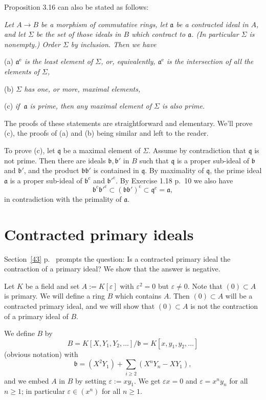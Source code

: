 \documentclass[parskip=half]{scrartcl}%
\newcommand{\oo}{\operatorname}
\newcommand{\mf}{\mathfrak}
\newcommand{\aaa}{\mf a}
\newcommand{\bbb}{\mf b}
\begin{document}
Proposition 3.16 can also be stated as follows:

\emph{Let $A\to B$ be a morphism of commutative rings, let $\aaa$ be a contracted ideal in $A$, and let $\Sigma$ be the set of those ideals in $B$ which contract to $\aaa$. (In particular $\Sigma$ is nonempty.) Order $\Sigma$ by inclusion. Then we have}

(a) \emph{$\aaa^{\oo e}$ is the least element of $\Sigma$, or, equivalently, $\aaa^{\oo e}$ is the intersection of all the elements of $\Sigma$,}

(b) \emph{$\Sigma$ has one, or more, maximal elements,}

(c) \emph{if $\ \aaa$ is prime, then any maximal element of $\Sigma$ is also prime.}

The proofs of these statements are straightforward and elementary. We'll prove (c), the proofs of (a) and (b) being similar and left to the reader.

To prove (c), let $\mf q$ be a maximal element of $\Sigma$. Assume by contradiction that $\mf q$ is not prime. Then there are ideals $\mf{b,b}'$ in $B$ such that $\mf q$ is a proper sub-ideal of $\bbb$ and $\bbb'$, and the product $\mf{bb}'$ is contained in $\mf q$. By maximality of $\mf q$, the prime ideal $\aaa$ is a proper sub-ideal of $\bbb^{\oo c}$ and $\bbb'^{\oo c}$. By Exercise 1.18 p.~10 we also have 
$$
\bbb^{\oo c}\bbb'^{\oo c}\subset(\mf{bb}')^{\oo c}\subset\mf q^{\oo c}=\aaa,
$$ 
in contradiction with the primality of $\aaa$.

\section{Contracted primary ideals}\label{cpi}%

Section~\ref{43} p.~\pageref{43} prompts the question: Is a contracted primary ideal the contraction of a primary ideal? We show that the answer is negative.

Let $K$ be a field and set $A:=K[\varepsilon]$ with $\varepsilon^2=0$ but $\varepsilon\ne0$. Note that $(0)\subset A$ is primary. We will define a ring $B$ which contains $A$. Then $(0)\subset A$ will be a contracted primary ideal, and we will show that $(0)\subset A$ is not the contraction of a primary ideal of $B$. 

We define $B$ by 
$$
B=K[X,Y_1,Y_2,\dots]/\mathfrak b=K[x,y_1,y_2,\dots]
$$ 
(obvious notation) with 
$$
\mathfrak b=(X^2Y_1)+\sum_{i\ge2}(X^nY_n-XY_1),
$$
and we embed $A$ in $B$ by setting $\varepsilon:=xy_1$. We get $\varepsilon x=0$ and $\varepsilon=x^ny_n$ for all $n\ge1$; in particular $\varepsilon\in(x^n)$ for all $n\ge1$.
\end{document}
